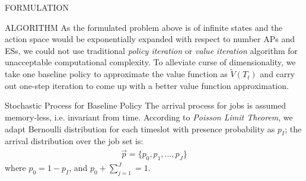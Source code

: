 \documentclass[10pt, conference, letterpaper]{IEEEtran}
\begin{document}
\begin{section}{FORMULATION}
    \end{section}

    \begin{section}{ALGORITHM}
        \label{sec:algorithm}
        As the formulated problem above is of infinite states and the action space would be exponentially expanded with respect to number APs and ESs, we could not use traditional \emph{policy iteration} or \emph{value iteration} algorithm \cite{sutton1998introduction} for unacceptable computational complexity. To alleviate curse of dimensionality, we take one baseline policy to approximate the value function as $\tilde{V}(T_t)$ and carry out one-step iteration to come up with a better value function approximation.

        \begin{subsection}{Stochastic Process for Baseline Policy}
            The arrival process for jobs is assumed memory-less, i.e. invariant from time. According to \emph{Poisson Limit Theorem}, we adapt Bernoulli distribution for each timeslot with presence probability as $p_I$; the arrival distribution over the job set is:
            \begin{align*}
                \vec{p} = \{ p_0, p_1,\dots,p_J \}
            \end{align*}
            where $p_0=1-p_I$, and $p_0+\sum_{j=1}^{J}=1$.


\end{subsection}
\end{section}
\end{document}
